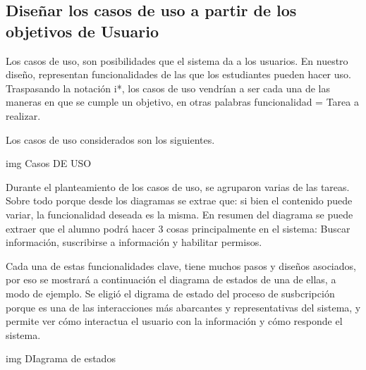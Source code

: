     \subsection{Diseñar los casos de uso a partir de los objetivos de Usuario}
    \par Los casos de uso, son posibilidades que el sistema da a los usuarios. En nuestro diseño, representan funcionalidades de las que los estudiantes pueden hacer uso. Traspasando la notación \gls{i*}, los casos de uso vendrían a ser cada una de las maneras en que se cumple un objetivo, en otras palabras funcionalidad = Tarea a realizar.
    \par Los casos de uso considerados son los siguientes.

        img Casos DE USO

    \par Durante el planteamiento de los casos de uso, se agruparon varias de las tareas. Sobre todo porque desde los diagramas se extrae que: si bien el contenido puede variar, la funcionalidad deseada es la misma.
    En resumen del diagrama se puede extraer que el alumno podrá hacer 3 cosas principalmente en el sistema: Buscar información, suscribirse a información y habilitar permisos.
    \par Cada una de estas funcionalidades clave, tiene muchos pasos y diseños asociados, por eso se mostrará a continuación el diagrama de estados de una de ellas, a modo de ejemplo. Se eligió el digrama de estado del proceso de susbcripción porque es una de las interacciones más abarcantes y representativas del sistema, y permite ver cómo interactua el usuario con la información y cómo responde el sistema.

        img DIagrama de estados
            

